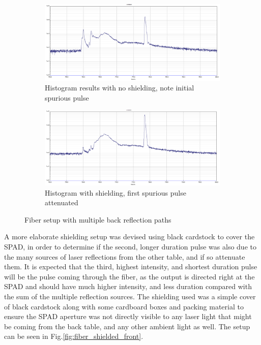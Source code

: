 \documentclass[a4paper]{article}
\begin{document}
\begin{figure}[!htb]
     \centering
     \begin{subfigure}[b]{1.0\textwidth}
         \centering
         \includegraphics[width=\textwidth]{figures/550_no_hand.PNG}
         \caption{Histogram results with no shielding, note initial spurious pulse}
         \label{fig:fiber_graph_no_hand}
     \end{subfigure}
     \hfill
     \begin{subfigure}[b]{1.0\textwidth}
         \centering
         \includegraphics[width=\textwidth]{figures/550-actually covered.PNG}
         \caption{Histogram with shielding, first spurious pulse attenuated}
         \label{fig:fiber_graph_hand}
     \end{subfigure}
        \caption{Fiber setup with multiple back reflection paths}
        \label{fig:fiber_graphs}
\end{figure}

A more elaborate shielding setup was devised using black cardstock to cover the SPAD, in order to determine if the second, longer duration pulse was also due to the many sources of laser reflections from the other table, and if so attenuate them. It is expected that the third, highest intensity, and shortest duration pulse will be the pulse coming through the fiber, as the output is directed right at the SPAD and should have much higher intensity, and less duration compared with the sum of the multiple reflection sources.
The shielding used was a simple cover of black cardstock along with some cardboard boxes and packing material to ensure the SPAD aperture was not directly visible to any laser light that might be coming from the back table, and any other ambient light as well. The setup can be seen in Fig.\ref{fig:fiber_shielded_front}.
\end{document}
